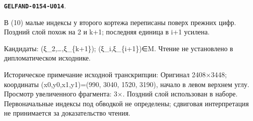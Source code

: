 \documentclass[11pt]{article}
\theoremstyle{definition}
\theoremstyle{remark}
\begin{document}
\par\noindent\leavevmode{}\label{GELFAND-0154-U014}\label{GELFAND-P001418:eq10-overwritten-indices:note}\textbf{\texttt{GELFAND-0154-U014}}.\nopagebreak[4]\par
В (10) малые индексы у второго кортежа переписаны поверх прежних цифр. Поздний слой похож на 2 и k+1; последняя единица в i+1 усилена.\par
Кандидаты: (ξ\_2,…,ξ\_\{k+1\}); (ξ\_i,ξ\_\{i+1\})∈M. Чтение не установлено в дипломатическом исходнике.\par
Историческое примечание исходной транскрипции: Оригинал 2408×3448; координаты (x0,y0,x1,y1)=(990, 3040, 1520, 3190), начало в левом верхнем углу. Просмотр увеличенного фрагмента: 3×. Поздний слой использован в наборе. Первоначальные индексы под обводкой не определены; сдвиговая интерпретация не принимается за доказательство чтения.\par\medskip
\end{document}
